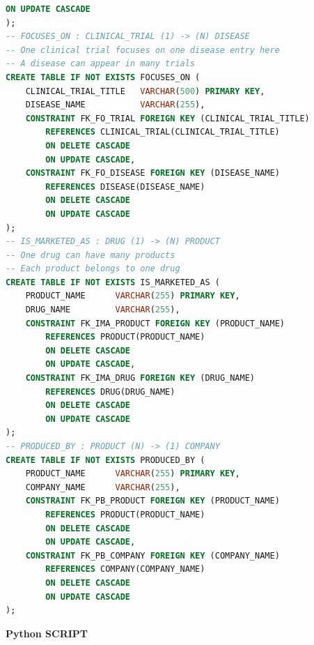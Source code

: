 \documentclass[12pt,a4paper]{article}
\begin{document}
\begin{lstlisting}[language=SQL,breaklines=true]
        ON UPDATE CASCADE
);
-- FOCUSES_ON : CLINICAL_TRIAL (1) -> (N) DISEASE
-- One clinical trial focuses on one disease entry here
-- A disease can appear in many trials
CREATE TABLE IF NOT EXISTS FOCUSES_ON (
    CLINICAL_TRIAL_TITLE   VARCHAR(500) PRIMARY KEY,
    DISEASE_NAME           VARCHAR(255),
    CONSTRAINT FK_FO_TRIAL FOREIGN KEY (CLINICAL_TRIAL_TITLE)
        REFERENCES CLINICAL_TRIAL(CLINICAL_TRIAL_TITLE)
        ON DELETE CASCADE
        ON UPDATE CASCADE,
    CONSTRAINT FK_FO_DISEASE FOREIGN KEY (DISEASE_NAME)
        REFERENCES DISEASE(DISEASE_NAME)
        ON DELETE CASCADE
        ON UPDATE CASCADE
);
-- IS_MARKETED_AS : DRUG (1) -> (N) PRODUCT
-- One drug can have many products
-- Each product belongs to one drug
CREATE TABLE IF NOT EXISTS IS_MARKETED_AS (
    PRODUCT_NAME      VARCHAR(255) PRIMARY KEY,
    DRUG_NAME         VARCHAR(255),
    CONSTRAINT FK_IMA_PRODUCT FOREIGN KEY (PRODUCT_NAME)
        REFERENCES PRODUCT(PRODUCT_NAME)
        ON DELETE CASCADE
        ON UPDATE CASCADE,
    CONSTRAINT FK_IMA_DRUG FOREIGN KEY (DRUG_NAME)
        REFERENCES DRUG(DRUG_NAME)
        ON DELETE CASCADE
        ON UPDATE CASCADE
);
-- PRODUCED_BY : PRODUCT (N) -> (1) COMPANY
CREATE TABLE IF NOT EXISTS PRODUCED_BY (
    PRODUCT_NAME      VARCHAR(255) PRIMARY KEY,
    COMPANY_NAME      VARCHAR(255),
    CONSTRAINT FK_PB_PRODUCT FOREIGN KEY (PRODUCT_NAME)
        REFERENCES PRODUCT(PRODUCT_NAME)
        ON DELETE CASCADE
        ON UPDATE CASCADE,
    CONSTRAINT FK_PB_COMPANY FOREIGN KEY (COMPANY_NAME)
        REFERENCES COMPANY(COMPANY_NAME)
        ON DELETE CASCADE
        ON UPDATE CASCADE
);

\end{lstlisting}
\newpage
\textbf{Python SCRIPT}\par
\end{document}
